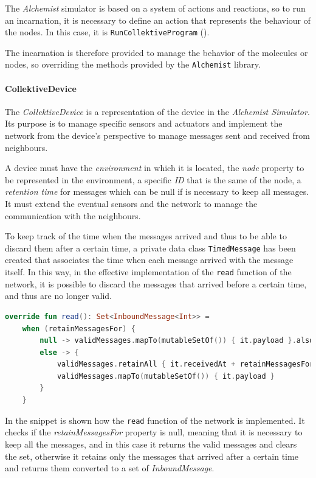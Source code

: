 The \emph{Alchemist} simulator is based on a system of actions and reactions, so to run an incarnation, it is necessary
to define an action that represents the behaviour of the nodes.
In this case, it is \texttt{RunCollektiveProgram} ().

The incarnation is therefore provided to manage the behavior of the molecules or nodes, so overriding the methods provided by the \texttt{Alchemist} library.

\paragraph{CollektiveDevice}
The \emph{CollektiveDevice} is a representation of the device in the \emph{Alchemist Simulator}.
Its purpose is to manage specific sensors and actuators and implement the network from the device's perspective to
manage messages sent and received from neighbours.

A device must have the \emph{environment} in which it is located, the \emph{node} property to be represented in the environment,
a specific \emph{ID} that is the same of the node, a \emph{retention time} for messages which can be null if is necessary
to keep all messages.
It must extend the eventual sensors and the network to manage the communication with the neighbours.

To keep track of the time when the messages arrived and thus to be able to discard them after a certain time,
a private data class \texttt{TimedMessage} has been created that associates the time when each message arrived with the message itself.
In this way, in the effective implementation of the \texttt{read} function of the network, it is possible
to discard the messages that arrived before a certain time, and thus are no longer valid.

\begin{lstlisting}[language=kt,label={lst:read},caption={The implementation of the \texttt{read} function of the \texttt{Network}.}]
override fun read(): Set<InboundMessage<Int>> =
    when (retainMessagesFor) {
        null -> validMessages.mapTo(mutableSetOf()) { it.payload }.also { validMessages.clear() }
        else -> {
            validMessages.retainAll { it.receivedAt + retainMessagesFor >= currentTime }
            validMessages.mapTo(mutableSetOf()) { it.payload }
        }
    }
\end{lstlisting}

In the  snippet is shown how the \texttt{read} function of the network is implemented.
It checks if the \emph{retainMessagesFor} property is null, meaning that it is necessary to keep all the messages,
and in this case it returns the valid messages and clears the set, otherwise it retains only the messages that arrived
after a certain time and returns them converted to a set of \emph{InboundMessage}.


